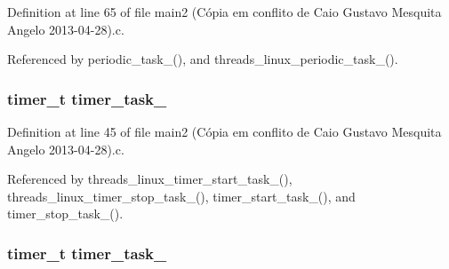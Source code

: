 Definition at line 65 of file main2 (\-Cópia em conflito de Caio Gustavo Mesquita Angelo 2013-\/04-\/28).\-c.



Referenced by periodic\-\_\-task\-\_(), and threads\-\_\-linux\-\_\-periodic\-\_\-task\-\_().

\hypertarget{main2_01_07C_xC3_xB3pia_01em_01conflito_01de_01Caio_01Gustavo_01Mesquita_01Angelo_012013-04-28_08_8c_a904a157c5d5f94416cd450f511635af1}{
\subsubsection[{timer\-\_\-task\-\_\-1}]{\setlength{\rightskip}{0pt plus 5cm}timer\-\_\-t timer\-\_\-task\-\_}}\label{main2_01_07C_xC3_xB3pia_01em_01conflito_01de_01Caio_01Gustavo_01Mesquita_01Angelo_012013-04-28_08_8c_a904a157c5d5f94416cd450f511635af1}


Definition at line 45 of file main2 (\-Cópia em conflito de Caio Gustavo Mesquita Angelo 2013-\/04-\/28).\-c.



Referenced by threads\-\_\-linux\-\_\-timer\-\_\-start\-\_\-task\-\_(), threads\-\_\-linux\-\_\-timer\-\_\-stop\-\_\-task\-\_(), timer\-\_\-start\-\_\-task\-\_(), and timer\-\_\-stop\-\_\-task\-\_().

\hypertarget{main2_01_07C_xC3_xB3pia_01em_01conflito_01de_01Caio_01Gustavo_01Mesquita_01Angelo_012013-04-28_08_8c_adf6e8e22925f399f086dea8671f39c08}{
\subsubsection[{timer\-\_\-task\-\_\-2}]{\setlength{\rightskip}{0pt plus 5cm}timer\-\_\-t timer\-\_\-task\-\_}}\label{main2_01_07C_xC3_xB3pia_01em_01conflito_01de_01Caio_01Gustavo_01Mesquita_01Angelo_012013-04-28_08_8c_adf6e8e22925f399f086dea8671f39c08}



